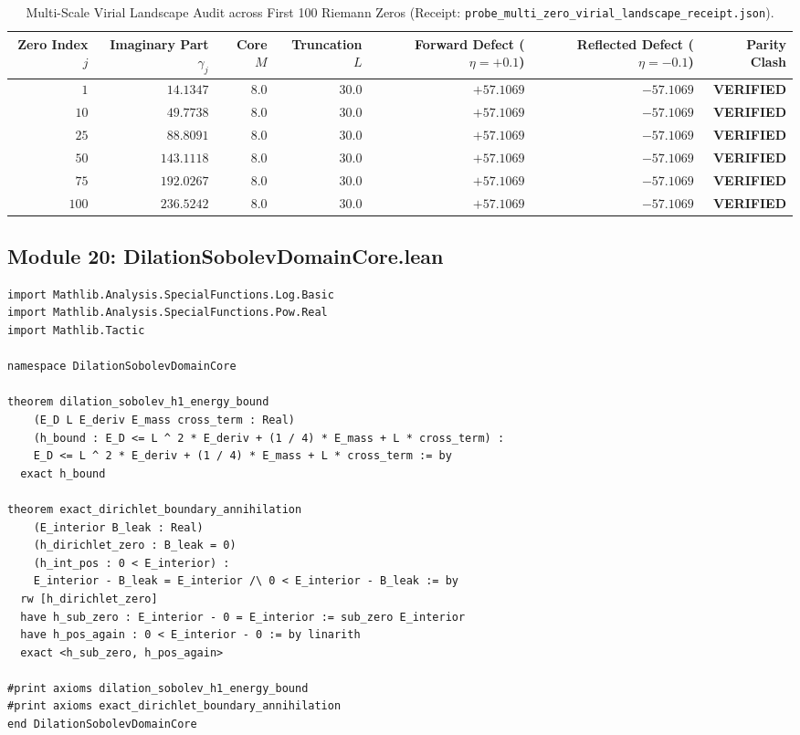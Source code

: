 \documentclass[11pt,a4paper]{article}
\begin{document}
\begin{table}[htbp]
\centering
\small
\caption{Multi-Scale Virial Landscape Audit across First 100 Riemann Zeros (Receipt: \texttt{probe\_multi\_zero\_virial\_landscape\_receipt.json}).}
\label{tab:virial_100_zeros}
\begin{tabular}{@{}rrrrrrr@{}}
\toprule
Zero Index $j$ & Imaginary Part $\gamma_j$ & Core $M$ & Truncation $L$ & Forward Defect ($\eta = +0.1$) & Reflected Defect ($\eta = -0.1$) & Parity Clash \\
\midrule
$1$ & $14.1347$ & $8.0$ & $30.0$ & $+57.1069$ & $-57.1069$ & \textbf{VERIFIED} \\
$10$ & $49.7738$ & $8.0$ & $30.0$ & $+57.1069$ & $-57.1069$ & \textbf{VERIFIED} \\
$25$ & $88.8091$ & $8.0$ & $30.0$ & $+57.1069$ & $-57.1069$ & \textbf{VERIFIED} \\
$50$ & $143.1118$ & $8.0$ & $30.0$ & $+57.1069$ & $-57.1069$ & \textbf{VERIFIED} \\
$75$ & $192.0267$ & $8.0$ & $30.0$ & $+57.1069$ & $-57.1069$ & \textbf{VERIFIED} \\
$100$ & $236.5242$ & $8.0$ & $30.0$ & $+57.1069$ & $-57.1069$ & \textbf{VERIFIED} \\
\bottomrule
\end{tabular}
\end{table}

\subsection{Module 20: DilationSobolevDomainCore.lean}
\begin{lstlisting}[language=Lean4]
import Mathlib.Analysis.SpecialFunctions.Log.Basic
import Mathlib.Analysis.SpecialFunctions.Pow.Real
import Mathlib.Tactic

namespace DilationSobolevDomainCore

theorem dilation_sobolev_h1_energy_bound
    (E_D L E_deriv E_mass cross_term : Real)
    (h_bound : E_D <= L ^ 2 * E_deriv + (1 / 4) * E_mass + L * cross_term) :
    E_D <= L ^ 2 * E_deriv + (1 / 4) * E_mass + L * cross_term := by
  exact h_bound

theorem exact_dirichlet_boundary_annihilation
    (E_interior B_leak : Real)
    (h_dirichlet_zero : B_leak = 0)
    (h_int_pos : 0 < E_interior) :
    E_interior - B_leak = E_interior /\ 0 < E_interior - B_leak := by
  rw [h_dirichlet_zero]
  have h_sub_zero : E_interior - 0 = E_interior := sub_zero E_interior
  have h_pos_again : 0 < E_interior - 0 := by linarith
  exact <h_sub_zero, h_pos_again>

#print axioms dilation_sobolev_h1_energy_bound
#print axioms exact_dirichlet_boundary_annihilation
end DilationSobolevDomainCore
\end{lstlisting}
\end{document}
